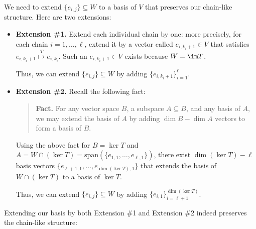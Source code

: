 We need to extend $\{e_{i, j}\} \subseteq W$ to a basis of $V$ that preserves our chain-like structure.  Here are two extensions:
\begin{itemize}
    \item \textbf{Extension \#1.} Extend each individual chain by one: more precisely, for each chain $i = 1, \dots, \ell$, extend it by a vector called $e_{i, k_i + 1} \in V$ that satisfies $e_{i, k_i + 1} \stackrel{T}{\mapsto} e_{i, k_i}$.  Such an $e_{i, k_i + 1} \in V$ exists because $W = \im T$.

    Thus, we can extend $\{e_{i, j}\} \subseteq W$ by adding $\{e_{i, k_i + 1}\}_{i = 1}^{\ell}$.
    \item \textbf{Extension \#2.} Recall the following fact:
\begin{quote}
    \textbf{Fact.} For any vector space $B$, a subspace $A \subseteq B$, and any basis of $A$, we may extend the basis of $A$ by adding $\dim B - \dim A$ vectors to form a basis of $B$.
\end{quote}
    Using the above fact for $B = \ker T$ and $A = W \cap (\ker T) = \mathrm{span}(\{e_{1, 1}, \dots, e_{\ell, 1}\})$, there exist $\dim(\ker T) - \ell$ basis vectors $\{e_{\ell + 1, 1}, \dots, e_{\dim (\ker T), 1} \}$ that extends the basis of $W \cap (\ker T)$ to a basis of $\ker T$.

    Thus, we can extend $\{e_{i, j}\} \subseteq W$ by adding $\{e_{i, 1}\}_{i = \ell + 1}^{\dim (\ker T)}$.
\end{itemize}
Extending our basis by both Extension \#1 and Extension \#2 indeed preserves the chain-like structure:
